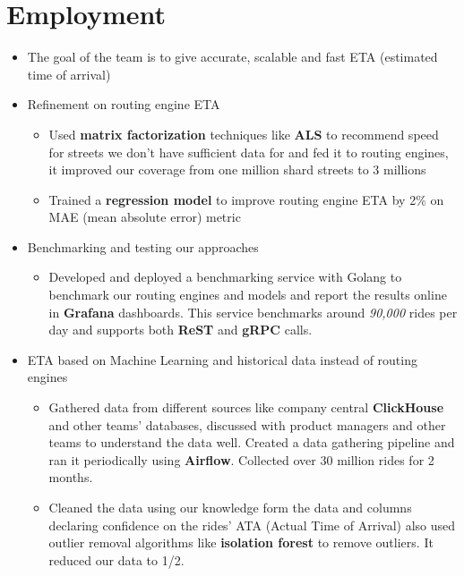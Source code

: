 \section{Employment}

\begin{itemize}
      \item The goal of the team is to give accurate, scalable and fast ETA (estimated time of arrival)
      \item Refinement on routing engine ETA
            \begin{itemize}
                  \item Used \textbf{matrix factorization} techniques like \textbf{ALS} to recommend speed for streets we don't have sufficient data for and fed it to routing engines, it improved our coverage from one million shard streets to 3 millions
                  \item Trained a \textbf{regression model} to improve routing engine ETA by 2\% on MAE (mean absolute error) metric
            \end{itemize}
      \item Benchmarking and testing our approaches
            \begin{itemize}
                  \item Developed and deployed a benchmarking service with Golang to benchmark our routing engines and models and report the results online in \textbf{Grafana} dashboards.
                        This service benchmarks around \textit{90,000} rides per day and supports both \textbf{ReST} and \textbf{gRPC} calls.
            \end{itemize}
      \item ETA based on Machine Learning and historical data instead of routing engines
            \begin{itemize}
                  \item Gathered data from different sources like company central \textbf{ClickHouse} and other teams' databases, discussed with product managers and other teams to understand the data well. Created a data gathering pipeline and ran it periodically using \textbf{Airflow}. Collected over 30 million rides for 2 months.
                  \item Cleaned the data using our knowledge form the data and columns declaring confidence on the rides' ATA (Actual Time of Arrival) also used outlier removal algorithms like \textbf{isolation forest} to remove outliers. It reduced our data to 1/2.

\end{itemize}
\end{itemize}
